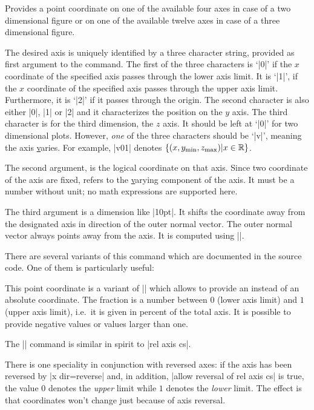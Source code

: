 \begin{command}{\pgfplotsqpointoutsideofaxis{}}
	Provides a point coordinate on one of the available four axes in case of a two dimensional figure or on one of the available twelve axes in case of a three dimensional figure.
	
	The desired axis is uniquely identified by a three character string, provided as first argument to the command. The first of the three characters is `|0|' if the $x$ coordinate of the specified axis passes through the lower axis limit. It is `|1|', if the $x$ coordinate of the specified axis passes through the upper axis limit. Furthermore, it is `|2|' if it passes through the origin. The second character is also either |0|, |1| or |2| and it characterizes the position on the $y$ axis. The third character is for the third dimension, the $z$ axis. It should be left at `|0|' for two dimensional plots. However, \emph{one} of the three characters should be `|v|', meaning the axis \underline varies. For example, |v01| denotes $\{ (x,y_{\text{min}},z_{\text{max}}) \vert x \in \mathbb{R} \}$.
	
	The second argument,  is the logical coordinate on that axis. Since two coordinate of the axis are fixed,  refers to the \underline varying component of the axis. It must be a number without unit; no math expressions are supported here.

	The third argument  is a dimension like |10pt|. It shifts the coordinate away from the designated axis in direction of the outer normal vector. The outer normal vector always points away from the axis. It is computed using
	|\pgfplotspointouternormalvectorofaxis|.

	There are several variants of this command which are documented in the source code. One of them is particularly useful:
\end{command}

\begin{command}{\pgfplotsqpointoutsideofaxisrel{}}
	This point coordinate is a variant of |\pgfplotsqpointoutsideofaxis| which allows to provide an  instead of an absolute coordinate. The fraction is a number between $0$ (lower axis limit) and $1$ (upper axis limit), i.e.\ it is given in percent of the total axis. It is possible to provide negative values or values larger than one.

	The |\pgfplotsqpointoutsideofaxisrel| command is similar in spirit to |rel axis cs|.

	There is one speciality in conjunction with reversed axes: if the axis has been reversed by |x dir=reverse| and, in addition, |allow reversal of rel axis cs| is true, the value $0$ denotes the \emph{upper} limit while $1$ denotes the \emph{lower} limit. The effect is that coordinates won't change just because of axis reversal.
%
\end{command}

